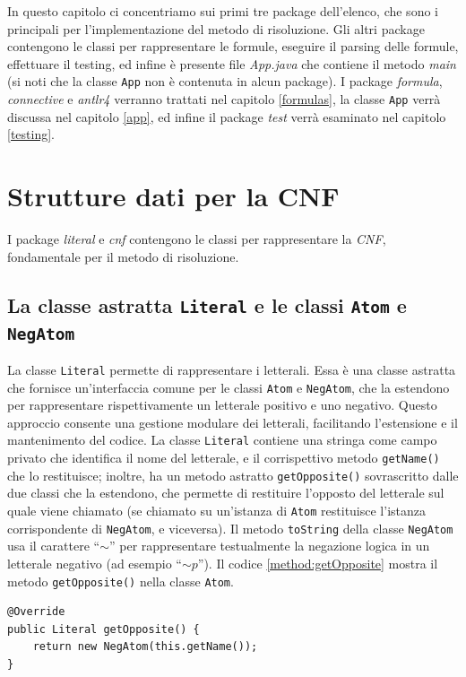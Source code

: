 \documentclass[a4paper,12pt]{report}
\begin{document}
In questo capitolo ci concentriamo sui primi tre package dell'elenco, che sono i principali per l'implementazione del metodo di risoluzione. Gli altri package contengono le classi per rappresentare le formule, eseguire il parsing delle formule, effettuare il testing, ed infine è presente file \emph{App.java} che contiene il metodo \emph{main} (si noti che la classe \texttt{App} non è contenuta in alcun package). I package \emph{formula}, \emph{connective} e \emph{antlr4} verranno trattati nel capitolo \ref{formulas}, la classe \texttt{App} verrà discussa nel capitolo \ref{app}, ed infine il package \emph{test} verrà esaminato nel capitolo \ref{testing}.


\section{Strutture dati per la CNF}
I package \emph{literal} e \emph{cnf} contengono le classi per rappresentare la \emph{CNF}, fondamentale per il metodo di risoluzione.

\subsection{La classe astratta \texttt{Literal} e le classi \texttt{Atom} e \texttt{NegAtom}}
\label{literal}
La classe \texttt{Literal} permette di rappresentare i letterali. Essa è una classe astratta che fornisce un'interfaccia comune per le classi \texttt{Atom} e \texttt{NegAtom}, che la estendono per rappresentare rispettivamente un letterale positivo e uno negativo. Questo approccio consente una gestione modulare dei letterali, facilitando l'estensione e il mantenimento del codice. La classe \texttt{Literal} contiene una stringa come campo privato che identifica il nome del letterale, e il corrispettivo metodo \texttt{getName()} che lo restituisce; inoltre, ha un metodo astratto \texttt{getOpposite()} sovrascritto dalle due classi che la estendono, che permette di restituire l'opposto del letterale sul quale viene chiamato (se chiamato su un'istanza di \texttt{Atom} restituisce l'istanza corrispondente di \texttt{NegAtom}, e viceversa). Il metodo \texttt{toString} della classe \texttt{NegAtom} usa il carattere ``\textbf{$\sim $}'' per rappresentare testualmente la negazione logica in un letterale negativo (ad esempio ``$\sim\!p$''). Il codice \ref{method:getOpposite} mostra il metodo \texttt{getOpposite()} nella classe \texttt{Atom}.

\begin{minipage}{\linewidth}
\begin{lstlisting}[caption={metodo astratto \texttt{getOpposite()} sovrascritto dalla classe \texttt{Atom}}, label={method:getOpposite}]
@Override
public Literal getOpposite() {
    return new NegAtom(this.getName());
}
\end{lstlisting}
\end{minipage}
\end{document}
